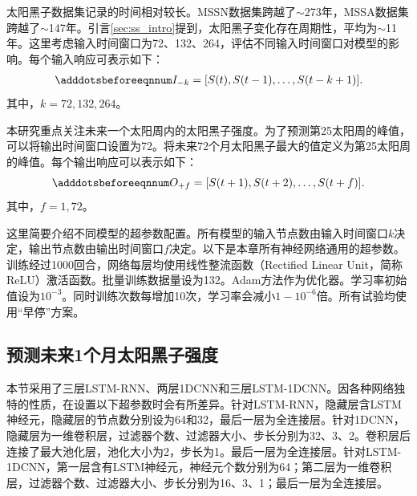 太阳黑子数据集记录的时间相对较长。MSSN数据集跨越了$\sim$273年，MSSA数据集跨越了$\sim$147年。引言\ref{sec:ss_intro}提到，太阳黑子变化存在周期性，平均为$\sim$11年。这里考虑输入时间窗口为72、132、264，评估不同输入时间窗口对模型的影响。每个输入响应可表示如下：
\begin{equation}\adddotsbeforeeqnnum
  \label{eq:ss_input}
  \begin{split}
    I_{-k}=[S(t),S(t-1),\ldots,S(t-k+1)].
  \end{split}
\end{equation}
其中，$k=72,132,264$。

本研究重点关注未来一个太阳周内的太阳黑子强度。为了预测第25太阳周的峰值，可以将输出时间窗口设置为72。将未来72个月太阳黑子最大的值定义为第25太阳周的峰值。每个输出响应可以表示如下：
\begin{equation}\adddotsbeforeeqnnum
  \label{eq:ss_output}
  O_{+f}=[S(t+1),S(t+2),\ldots,S(t+f)].
\end{equation}
其中，$f=1,72$。

这里简要介绍不同模型的超参数配置。所有模型的输入节点数由输入时间窗口$k$决定，输出节点数由输出时间窗口$f$决定。以下是本章所有神经网络通用的超参数。训练经过1000回合，网络每层均使用线性整流函数（Rectified Linear Unit，简称ReLU）激活函数。批量训练数据量设为132。Adam方法作为优化器。学习率初始值设为$10^{-3}$。同时训练次数每增加10次，学习率会减小$1-10^{-6}$倍。所有试验均使用“早停”方案。

\subsection{预测未来1个月太阳黑子强度}\label{sec:ss_result_1}

本节采用了三层LSTM-RNN、两层1DCNN和三层LSTM-1DCNN。因各种网络独特的性质，在设置以下超参数时会有所差异。针对LSTM-RNN，隐藏层含LSTM神经元，隐藏层的节点数分别设为64和32，最后一层为全连接层。针对1DCNN，隐藏层为一维卷积层，过滤器个数、过滤器大小、步长分别为32、3、2。卷积层后连接了最大池化层，池化大小为2，步长为1。最后一层为全连接层。针对LSTM-1DCNN，第一层含有LSTM神经元，神经元个数分别为64；第二层为一维卷积层，过滤器个数、过滤器大小、步长分别为16、3、1；最后一层为全连接层。 

